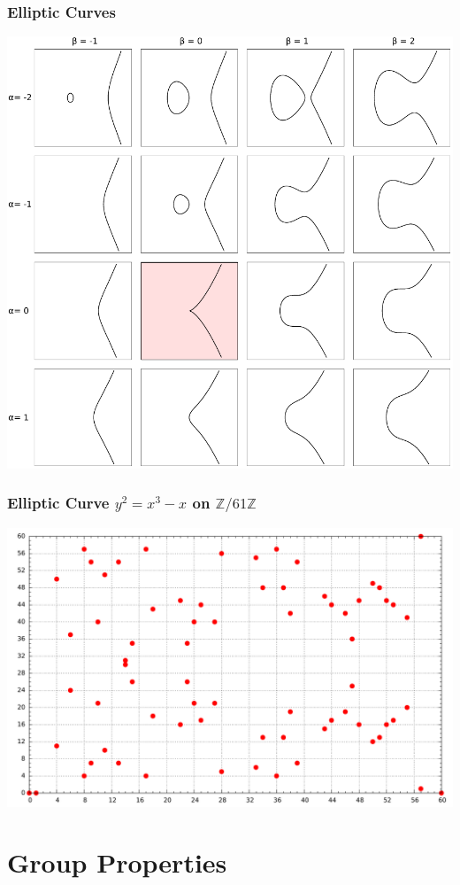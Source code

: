 \documentclass{beamer}
\newcommand{\zmod}[1]{\ensuremath{\mathbb{Z}/#1\mathbb{Z}}}
\begin{document}
    \begin{frame}
        \frametitle{Elliptic Curves}
        \centering
        \includegraphics[height=.9\textheight]{EllipticCurveCatalog.pdf}
    \end{frame}

    \begin{frame}
        \frametitle{Elliptic Curve \(y^2 = x^3 - x\) on \zmod{61}}
        \centering
        \includegraphics[width=\textwidth]{Z61.pdf}
    \end{frame}

    \section{Group Properties}
\end{document}
